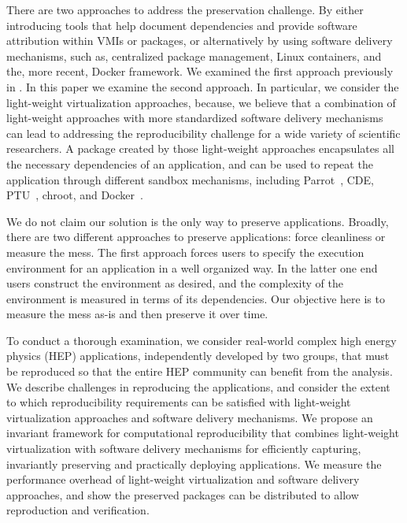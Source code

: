 
There are two approaches to address the preservation challenge. By either introducing tools that help document dependencies and provide software attribution within VMIs or packages, or alternatively by using software delivery mechanisms, such as, centralized package management, Linux containers, and the, more recent, Docker framework. We examined the first approach previously in \cite{SoftProv}. 
In this paper we examine the second approach.  
In particular, we consider the light-weight virtualization approaches, because, we believe that a combination of light-weight approaches with more standardized software delivery mechanisms can lead to addressing the reproducibility challenge for a wide variety of scientific researchers.  
A package created by those light-weight approaches encapsulates all the necessary dependencies of an application, and can be used to repeat the application through different sandbox mechanisms, including Parrot~\cite{thain2005parrot}, CDE, PTU~\cite{PTU}, chroot, and Docker~\cite{boettiger2015introduction}. 

We do not claim our solution is the only way to preserve applications. Broadly, there are two different approaches to preserve applications: force cleanliness or measure the mess. The first approach forces users to specify the execution environment for an application in a well organized way. In the latter one end users construct the environment as desired, and the complexity of the environment is measured in terms of its dependencies. 
Our objective here is to measure the mess as-is and then preserve it over time.

To conduct a thorough examination, we consider real-world complex high energy physics (HEP) applications, independently developed by two groups, that must be reproduced so that the entire HEP community can benefit from the analysis. We describe challenges in reproducing the applications, and consider the extent to which reproducibility requirements can be satisfied with light-weight virtualization approaches and software delivery mechanisms. We propose an invariant framework for computational reproducibility that combines light-weight virtualization with software delivery mechanisms for efficiently capturing, invariantly preserving and practically deploying applications.
We measure the performance overhead of  light-weight virtualization and software delivery approaches, and show the preserved packages can be distributed to allow reproduction and verification.

